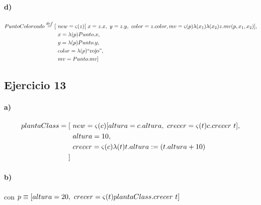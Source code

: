 \documentclass[10pt,a4paper]{article}
\begin{document}
\paragraph{d)}
\begin{align*}
PuntoColoreado \overset{def}{=} [~& new = \varsigma(z)[~x=z.x,~y = z.y,~color=z.color, mv = \varsigma(p)\lambda(x_1)\lambda(x_2) z.mv(p,x_1,x_2)]
, \\
&  x = \lambda(p)Punto.x, \\
&  y = \lambda(p)Punto.y, \\
&  color = \lambda(p)\text{``rojo''}, \\ 
&  mv = Punto.mv ] \\
\end{align*}

\subsection{Ejercicio 13}
\paragraph{a)}
\begin{align*}
plantaClass = [~& new = \varsigma(c)[altura = c.altura,~crecer = \varsigma(t)c.crecer~t], \\
&altura = 10,\\
&crecer = \varsigma(c)\lambda(t)t.altura := (t.altura + 10) \\
]~&\\
\end{align*}

\paragraph{b)}
	\vspace{5mm}
	\begin{center}
		\begin{scprooftree}
		\def\extraVskip{5pt}

    \RightLabel{[Sel]}
		\end{scprooftree}    
	\end{center}

    con $p \equiv [altura = 20,~crecer = \varsigma(t)plantaClass.crecer~t]$
    
\end{document}
